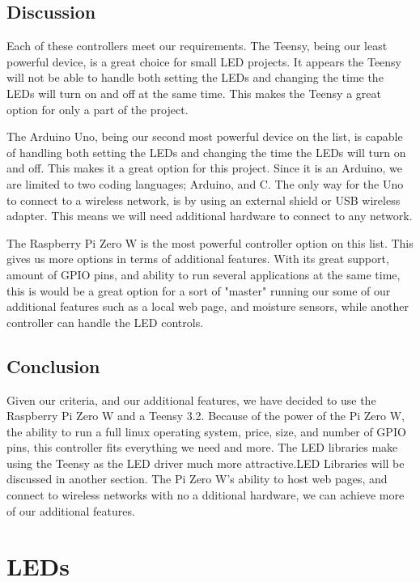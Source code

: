 \documentclass[onecolumn, draftclsnofoot,10pt, compsoc]{IEEEtran}
\begin{document}
		\subsection{Discussion}
		\noindent Each of these controllers meet our
		requirements. The Teensy, being our least powerful device, is a great choice
		for small LED projects. It appears the Teensy will not be able to handle
		both setting the LEDs and changing the time the LEDs will turn on and off
		at the same time. This makes the Teensy a great option for only a part of
		the project.

		\vspace{5mm}
		\noindent The Arduino Uno, being our second most powerful device on the
		list, is capable of handling both setting the LEDs and changing the time
		the LEDs will turn on and off. This makes it a great option for this
		project. Since it is an Arduino, we are limited to two coding languages;
		Arduino, and C. The only way for the Uno to connect to a wireless network,
		is by using an external shield or USB wireless adapter. This means we will
		need additional hardware to connect to any network.


		\vspace{5mm}
		\noindent The Raspberry Pi Zero W is the most powerful controller option on
		this list. This gives us more options in terms of additional
		features. With its great support, amount of GPIO pins, and ability to run
		several applications at the same time, this is would be a great option for
		a sort of "master" running our some of our additional features such as a
		local web page, and moisture sensors, while another controller can handle
		the LED controls.

		\subsection{Conclusion}
		\noindent Given our criteria, and our additional features, we have decided
		to use the Raspberry Pi Zero W and a Teensy 3.2. Because of the power of the
		Pi Zero W, the ability to run a full linux operating system, price, size,
		and number of GPIO pins, this controller fits everything we need and more.
		The LED libraries make using the Teensy as the LED driver much more
		attractive.LED Libraries will be discussed in another section. The Pi Zero
		W's ability to host web pages, and connect to wireless networks with no a
		dditional hardware, we can achieve more of our additional features.

	\section{LEDs}
\end{document}
